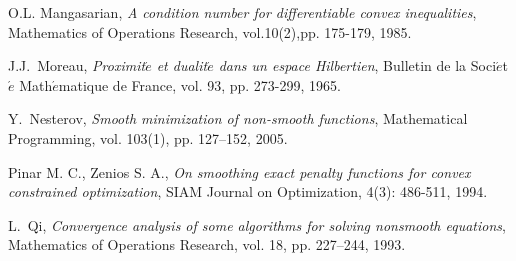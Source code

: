 \documentclass[12pt]{article}
\begin{document}
\begin{thebibliography}{1}
 {\sc O.L. Mangasarian},
  {\em A condition number for differentiable convex inequalities},
   Mathematics of Operations Research, vol.10(2),pp. 175-179, 1985.
%
%
%
%
%
%
%

 {\sc J.J.\ Moreau},
 {\em Proximit$\acute{e}$ et dualit$\acute{e}$ dans un espace Hilbertien},
 Bulletin de la Soci$\acute{e}$t$\acute{e}$ Math$\acute{e}$matique de France,
 vol. 93,  pp. 273-299, 1965.

 {\sc Y.\ Nesterov},
 {\em Smooth minimization of non-smooth functions},
 Mathematical Programming, vol. 103(1), pp. 127--152, 2005.

 {\sc Pinar M. C., Zenios S. A.},
 {\em On smoothing exact penalty functions for convex constrained optimization},
 SIAM Journal on Optimization, 4(3): 486-511, 1994.


 {\sc L.\ Qi},
 {\em Convergence analysis of some algorithms for solving nonsmooth equations},
 Mathematics of Operations Research, vol. 18, pp. 227--244, 1993.


\end{thebibliography}
\end{document}
